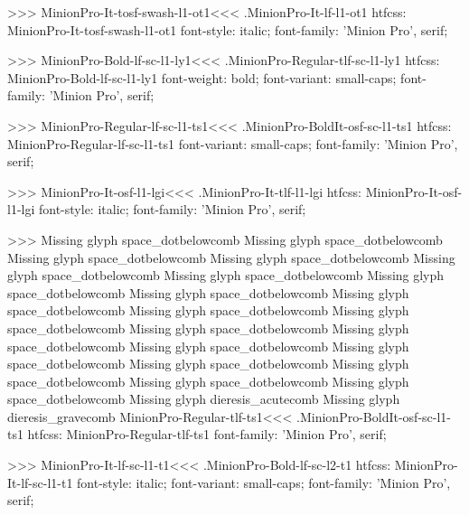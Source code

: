 {{>>>
\<MinionPro-It-tosf-swash-l1-ot1\><<<
.MinionPro-It-lf-l1-ot1
htfcss:  MinionPro-It-tosf-swash-l1-ot1  font-style: italic; font-family: 'Minion Pro', serif;

>>>
\<MinionPro-Bold-lf-sc-l1-ly1\><<<
.MinionPro-Regular-tlf-sc-l1-ly1
htfcss:  MinionPro-Bold-lf-sc-l1-ly1  font-weight: bold; font-variant: small-caps; font-family: 'Minion Pro', serif;

>>>
\<MinionPro-Regular-lf-sc-l1-ts1\><<<
.MinionPro-BoldIt-osf-sc-l1-ts1
htfcss:  MinionPro-Regular-lf-sc-l1-ts1  font-variant: small-caps; font-family: 'Minion Pro', serif;

>>>
\<MinionPro-It-osf-l1-lgi\><<<
.MinionPro-It-tlf-l1-lgi
htfcss:  MinionPro-It-osf-l1-lgi  font-style: italic; font-family: 'Minion Pro', serif;

>>>
Missing glyph	space_dotbelowcomb
Missing glyph	space_dotbelowcomb
Missing glyph	space_dotbelowcomb
Missing glyph	space_dotbelowcomb
Missing glyph	space_dotbelowcomb
Missing glyph	space_dotbelowcomb
Missing glyph	space_dotbelowcomb
Missing glyph	space_dotbelowcomb
Missing glyph	space_dotbelowcomb
Missing glyph	space_dotbelowcomb
Missing glyph	space_dotbelowcomb
Missing glyph	space_dotbelowcomb
Missing glyph	space_dotbelowcomb
Missing glyph	space_dotbelowcomb
Missing glyph	space_dotbelowcomb
Missing glyph	space_dotbelowcomb
Missing glyph	space_dotbelowcomb
Missing glyph	space_dotbelowcomb
Missing glyph	space_dotbelowcomb
Missing glyph	dieresis_acutecomb
Missing glyph	dieresis_gravecomb
\<MinionPro-Regular-tlf-ts1\><<<
.MinionPro-BoldIt-osf-sc-l1-ts1
htfcss:  MinionPro-Regular-tlf-ts1  font-family: 'Minion Pro', serif;

>>>
\<MinionPro-It-lf-sc-l1-t1\><<<
.MinionPro-Bold-lf-sc-l2-t1
htfcss:  MinionPro-It-lf-sc-l1-t1  font-style: italic; font-variant: small-caps; font-family: 'Minion Pro', serif;

}}
